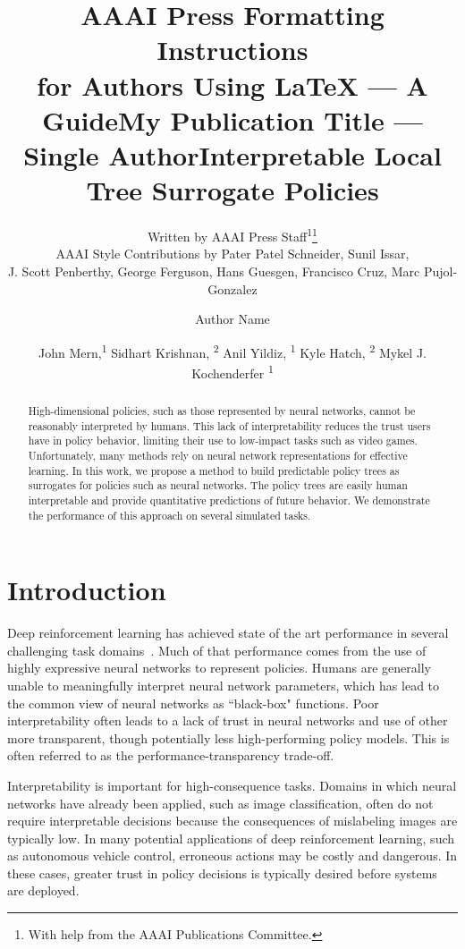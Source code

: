 \documentclass[letterpaper]{article} %
\title{AAAI Press Formatting Instructions \\for Authors Using \LaTeX{} --- A Guide}
\author{
    Written by AAAI Press Staff\textsuperscript{\rm 1}\thanks{With help from the AAAI Publications Committee.}\\
    AAAI Style Contributions by Pater Patel Schneider,
    Sunil Issar,\\
    J. Scott Penberthy,
    George Ferguson,
    Hans Guesgen,
    Francisco Cruz\equalcontrib,
    Marc Pujol-Gonzalez\equalcontrib
}
\title{My Publication Title --- Single Author}
\author {
    Author Name
}
\title{Interpretable Local Tree Surrogate Policies}
\author {
    John Mern,\textsuperscript{\rm 1}
    Sidhart Krishnan, \textsuperscript{\rm 2}
    Anil Yildiz, \textsuperscript{\rm 1}
    Kyle Hatch, \textsuperscript{\rm 2}
    Mykel J. Kochenderfer \textsuperscript{\rm 1}
}
\begin{document}
\maketitle
\begin{abstract}
High-dimensional policies, such as those represented by neural networks, cannot be reasonably interpreted by humans.
This lack of interpretability reduces the trust users have in policy behavior, limiting their use to low-impact tasks such as video games.
Unfortunately, many methods rely on neural network representations for effective learning.
In this work, we propose a method to build predictable policy trees as surrogates for policies such as neural networks.
The policy trees are easily human interpretable and provide quantitative predictions of future behavior.
We demonstrate the performance of this approach on several simulated tasks.
\end{abstract}
\section{Introduction}

Deep reinforcement learning has achieved state of the art performance in several challenging task domains~\cite{mnih2015}.
Much of that performance comes from the use of highly expressive neural networks to represent policies.
Humans are generally unable to meaningfully interpret neural network parameters, which has lead to the common view of neural networks as ``black-box" functions.
Poor interpretability often leads to a lack of trust in neural networks and use of other more transparent, though potentially less high-performing policy models.
This is often referred to as the performance-transparency trade-off. %

Interpretability is important for high-consequence tasks.
Domains in which neural networks have already been applied, such as image classification, often do not require interpretable decisions because the consequences of mislabeling images are typically low.
In many potential applications of deep reinforcement learning, such as autonomous vehicle control, erroneous actions may be costly and dangerous.
In these cases, greater trust in policy decisions is typically desired before systems are deployed.
\end{document}
